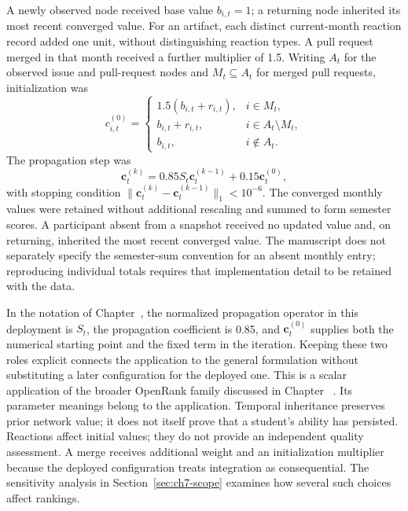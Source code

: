 A newly observed node received base value \(b_{i,t}=1\); a returning node inherited its most recent converged value. For an artifact, each distinct current-month reaction record added one unit, without distinguishing reaction types. A pull request merged in that month received a further multiplier of 1.5. Writing \(A_t\) for the observed issue and pull-request nodes and \(M_t\subseteq A_t\) for merged pull requests, initialization was
\begin{equation}
c^{(0)}_{i,t}=\begin{cases}
1.5(b_{i,t}+r_{i,t}),&i\in M_t,\\
b_{i,t}+r_{i,t},&i\in A_t\setminus M_t,\\
b_{i,t},&i\notin A_t.
\end{cases}
\label{eq:ch7-initial}
\end{equation}
The propagation step was
\begin{equation}
\mathbf c_t^{(k)}=0.85S_t\mathbf c_t^{(k-1)}+0.15\mathbf c_t^{(0)},
\label{eq:ch7-update}
\end{equation}
with stopping condition \(\|\mathbf c_t^{(k)}-\mathbf c_t^{(k-1)}\|_1<10^{-6}\). The converged monthly values were retained without additional rescaling and summed to form semester scores. A participant absent from a snapshot received no updated value and, on returning, inherited the most recent converged value. The manuscript does not separately specify the semester-sum convention for an absent monthly entry; reproducing individual totals requires that implementation detail to be retained with the data.

In the notation of Chapter~, the normalized propagation operator in this deployment is \(S_t\), the propagation coefficient is 0.85, and \(\mathbf c_t^{(0)}\) supplies both the numerical starting point and the fixed term in the iteration. Keeping these two roles explicit connects the application to the general formulation without substituting a later configuration for the deployed one. This is a scalar application of the broader OpenRank family discussed in Chapter~ \citep{han2026rank}. Its parameter meanings belong to the application. Temporal inheritance preserves prior network value; it does not itself prove that a student's ability has persisted. Reactions affect initial values; they do not provide an independent quality assessment. A merge receives additional weight and an initialization multiplier because the deployed configuration treats integration as consequential. The sensitivity analysis in Section~\ref{sec:ch7-scope} examines how several such choices affect rankings.

